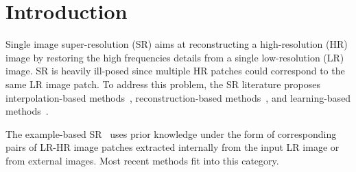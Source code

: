 \documentclass[10pt,twocolumn,letterpaper]{article}
\begin{document}
\section{Introduction}

Single image super-resolution (SR) aims at reconstructing a high-resolution (HR) image by restoring the high frequencies details from a single low-resolution (LR) image.
SR is heavily ill-posed since multiple HR patches could correspond to the same LR image patch.
To address this problem, the SR literature proposes interpolation-based methods~\cite{Thevenaz-BOOK-2000}, reconstruction-based methods~\cite{Chang-CVPR-2004,Glasner-ICCV-2009,Protter-TIP-2009,Yang-TIP-2010,Zeyde-CS-2012}, and learning-based methods~\cite{Kim-PAMI-2010,Dong-TIP-2011,Timofte-ICCV-2013,Timofte-ACCV-2014,Dong-ECCV-2014,Zhang-TIP-2015,Dai-EG-2015}.

The example-based SR~\cite{Freeman-CGA-2002} uses prior knowledge under the form of corresponding pairs of LR-HR image patches extracted internally from the input LR image or from external images. Most recent methods fit into this category. 
\end{document}

